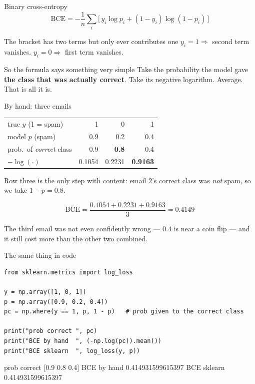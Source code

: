 \documentclass[aspectratio=169]{beamer}
\begin{document}
\begin{frame}{Binary cross-entropy}
  \[
    \mathrm{BCE} = -\frac{1}{n}\sum_i
      \Big[\, y_i \log p_i + (1-y_i)\log(1-p_i) \,\Big]
  \]
  \vspace{0.2em}
  \begin{alertblock}{The bracket has two terms but only ever contributes one}
    $y_i = 1 \Rightarrow$ second term vanishes.\quad
    $y_i = 0 \Rightarrow$ first term vanishes.
  \end{alertblock}
  \vspace{0.5em}
  \begin{exampleblock}{So the formula says something very simple}
    Take the probability the model gave \textbf{the class that was actually
    correct}. Take its negative logarithm. Average. That is all it is.
  \end{exampleblock}
\end{frame}

\begin{frame}{By hand: three emails}
  \begin{center}
  \begin{tabular}{@{}lrrr@{}}
    \toprule
    true $y$ (1 = spam)     & 1   & 0   & 1\\
    model $p$ (spam)        & 0.9 & 0.2 & 0.4\\
    \midrule
    prob.\ of \emph{correct} class & 0.9 & \textbf{0.8} & 0.4\\
    $-\log(\cdot)$          & 0.1054 & 0.2231 & \textbf{0.9163}\\
    \bottomrule
  \end{tabular}
  \end{center}
  \vspace{0.5em}
  \begin{center}
    \small Row three is the only step with content: email 2's correct class was
    \emph{not} spam, so we take $1-p = 0.8$.
  \end{center}
  \vspace{0.3em}
  \[
    \mathrm{BCE} = \frac{0.1054+0.2231+0.9163}{3} = \mathbf{0.4149}
  \]
  \begin{center}\small
    The third email was not even confidently wrong --- $0.4$ is near a coin
    flip --- and it still cost more than the other two combined.
  \end{center}
\end{frame}

\begin{frame}[fragile]{The same thing in code}
\begin{lstlisting}
from sklearn.metrics import log_loss

y = np.array([1, 0, 1])
p = np.array([0.9, 0.2, 0.4])
pc = np.where(y == 1, p, 1 - p)   # prob given to the correct class

print("prob correct ", pc)
print("BCE by hand  ", (-np.log(pc)).mean())
print("BCE sklearn  ", log_loss(y, p))
\end{lstlisting}
\begin{outblk}
prob correct  [0.9 0.8 0.4]
BCE by hand   0.414931599615397
BCE sklearn   0.414931599615397
\end{outblk}
\end{frame}
\end{document}
